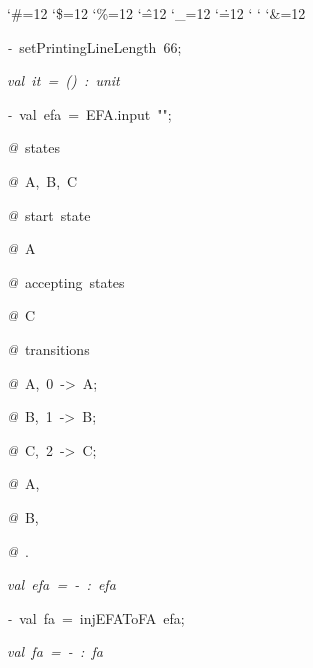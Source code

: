 \begin{list}{}
{\setlength{\leftmargin}{\leftmargini}
\setlength{\rightmargin}{0cm}
\setlength{\itemindent}{0cm}
\setlength{\listparindent}{0cm}
\setlength{\itemsep}{0cm}
\setlength{\parsep}{0cm}
\setlength{\labelsep}{0cm}
\setlength{\labelwidth}{0cm}
\catcode`\#=12
\catcode`\$=12
\catcode`\%=12
\catcode`\^=12
\catcode`\_=12
\catcode`\.=12
\catcode`
\catcode`
\catcode`\&=12
\ttfamily}
\small
\item[]\textsl{-\ }setPrintingLineLength\ 66;
\item[]\textsl{val\ it\ =\ ()\ :\ unit}
\item[]\textsl{-\ }val\ efa\ =\ EFA.input\ "";
\item[]\textsl{@\ }states
\item[]\textsl{@\ }A,\ B,\ C
\item[]\textsl{@\ }start\ state
\item[]\textsl{@\ }A
\item[]\textsl{@\ }accepting\ states
\item[]\textsl{@\ }C
\item[]\textsl{@\ }transitions
\item[]\textsl{@\ }A,\ 0\ ->\ A;
\item[]\textsl{@\ }B,\ 1\ ->\ B;
\item[]\textsl{@\ }C,\ 2\ ->\ C;
\item[]\textsl{@\ }A,\ %
\item[]\textsl{@\ }B,\ %
\item[]\textsl{@\ }.
\item[]\textsl{val\ efa\ =\ -\ :\ efa}
\item[]\textsl{-\ }val\ fa\ =\ injEFAToFA\ efa;
\item[]\textsl{val\ fa\ =\ -\ :\ fa}
\end{list}
